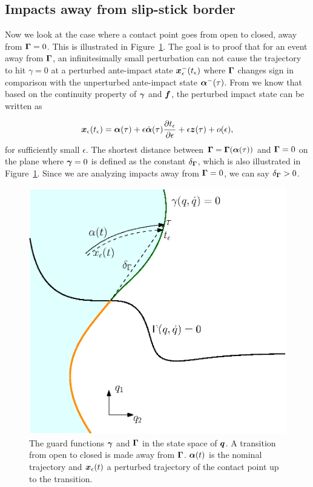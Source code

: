 \documentclass[DC2017114Bouma.tex]{subfiles}
\begin{document}
\subsection{Impacts away from slip-stick border}
Now we look at the case where a contact point goes from open to closed, away from $\boldsymbol{\Gamma} = 0$. This is illustrated in Figure~\ref{fig:impactfromborder}. The goal is to proof that for an event away from $\boldsymbol{\Gamma}$, an infinitesimally small perturbation can not cause the trajectory to hit $\gamma = 0$ at a perturbed ante-impact state ${\boldsymbol{x}}_\epsilon^-(t_\epsilon)$ where $\boldsymbol{\Gamma}$ changes sign in comparison with the unperturbed ante-impact state $\boldsymbol{\alpha}^-(\tau)$. From \cite[p. 6]{Rijnen2018} we know that based on the continuity property of $\boldsymbol{\gamma}$ and ${\boldsymbol{f}}$, the perturbed impact state can be written as

\begin{align}
{\boldsymbol{x}}_\epsilon(t_\epsilon) = \boldsymbol{\alpha}(\tau) +\epsilon\dot{\boldsymbol{\alpha}}(\tau)\frac{\partial t_\epsilon}{\partial \epsilon} + \epsilon{\boldsymbol{z}}(\tau) + o(\epsilon),\label{eq:appxpert}
\end{align}
for sufficiently small $\epsilon$. The shortest distance between $\boldsymbol{\Gamma} = \boldsymbol{\Gamma}(\boldsymbol{\alpha}(\tau))$ and $\boldsymbol{\Gamma} = 0$ on the plane where $\boldsymbol{\gamma} = 0$ is defined as the constant $\delta_{\boldsymbol{\Gamma}}$, which is also illustrated in Figure~\ref{fig:impactfromborder}. Since we are analyzing impacts away from $\boldsymbol{\Gamma} = 0$, we can say $\delta_{\boldsymbol{\Gamma}}>0$. 

\begin{figure}[h]
\centering
\includegraphics[width=.5\textwidth,trim={0cm 2.5cm 2cm 2.4cm},clip]{impactfromborder.eps}\caption{The guard functions $\boldsymbol{\gamma}$ and $\boldsymbol{\Gamma}$ in the state space of ${\boldsymbol{q}}$. A transition from open to closed is made away from $\boldsymbol{\Gamma}$. $\boldsymbol{\alpha}(t)$ is the nominal trajectory and ${\boldsymbol{x}}_\epsilon(t)$ a perturbed trajectory of the contact point up to the transition.} \label{fig:impactfromborder}
\end{figure}
\end{document}
